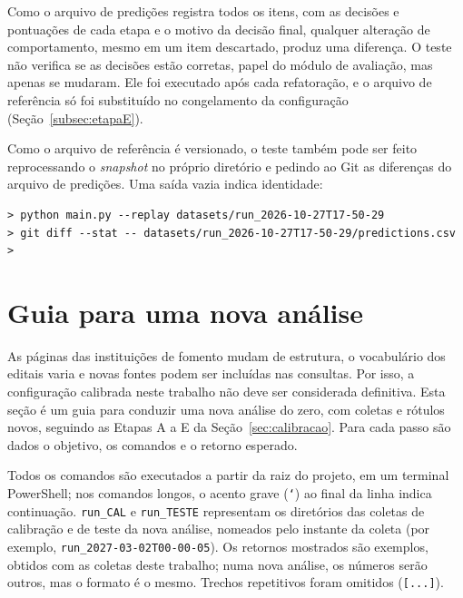 Como o arquivo de predições registra todos os itens, com as decisões e
pontuações de cada etapa e o motivo da decisão final, qualquer alteração de
comportamento, mesmo em um item descartado, produz uma diferença. O teste não
verifica se as decisões estão corretas, papel do módulo de avaliação, mas
apenas se mudaram. Ele foi executado após cada refatoração, e o arquivo de
referência só foi substituído no congelamento da configuração
(Seção~\ref{subsec:etapaE}).

Como o arquivo de referência é versionado, o teste também pode ser feito
reprocessando o \textit{snapshot} no próprio diretório e pedindo ao Git as
diferenças do arquivo de predições. Uma saída vazia indica identidade:

\begin{footnotesize}
\begin{verbatim}
> python main.py --replay datasets/run_2026-10-27T17-50-29
> git diff --stat -- datasets/run_2026-10-27T17-50-29/predictions.csv
>
\end{verbatim}
\end{footnotesize}

\section{Guia para uma nova análise}
\label{sec:impl_recalibracao}

As páginas das instituições de fomento mudam de estrutura, o vocabulário dos
editais varia e novas fontes podem ser incluídas nas consultas. Por isso, a
configuração calibrada neste trabalho não deve ser considerada definitiva.
Esta seção é um guia para conduzir uma nova análise do zero, com coletas e
rótulos novos, seguindo as Etapas A a E da Seção~\ref{sec:calibracao}. Para
cada passo são dados o objetivo, os comandos e o retorno esperado.

Todos os comandos são executados a partir da raiz do projeto, em um terminal
PowerShell; nos comandos longos, o acento grave (\texttt{`}) ao final da linha
indica continuação. \texttt{run\_CAL} e \texttt{run\_TESTE} representam os
diretórios das coletas de calibração e de teste da nova análise, nomeados pelo
instante da coleta (por exemplo, \texttt{run\_2027-03-02T00-00-05}). Os
retornos mostrados são exemplos, obtidos com as coletas deste trabalho; numa
nova análise, os números serão outros, mas o formato é o mesmo. Trechos
repetitivos foram omitidos (\texttt{[...]}).

